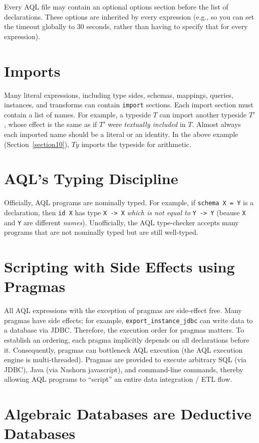 \documentclass[10pt]{book}
\begin{document}
Every AQL file may contain an optional options section before the list of declarations.  These options are inherited by every expression (e.g., so you can set the timeout globally to 30 seconds, rather than having to specify that for every expression).  

\section{Imports}

Many literal expressions, including type sides, schemas, mappings, queries, instances, and transforms can contain {\tt import} sections.  Each import section must contain a list of names.  For example, a typeside $T$ can import another typeside $T'$, whose effect is the same as if $T'$ were {\it textually included} in $T$.  Almost always each imported name should be a literal or an identity.  In the above example (Section~\ref{section10}), $Ty$ imports the typeside for arithmetic.
 
\section{AQL's Typing Discipline}

Officially, AQL programs are nominally typed.  For example, if {\tt schema X = Y} is a declaration, then {\tt id X} has type {\tt X -> X} {\it which is not equal to} {\tt Y -> Y} (beause {\tt X} and {\tt Y} are different {\it names}).  Unofficially, the AQL type-checker accepts many programs that are not nominally typed but are still well-typed.

\section{Scripting with Side Effects using Pragmas}

All AQL expressions with the exception of pragmas are side-effect free.  Many pragmas have side effects; for example, {\tt export\_instance\_jdbc} can write data to a database via JDBC.  Therefore, the execution order for pragmas matters.  To establish an ordering, each pragma implicitly depends on all declarations before it.  Consequently, pragmas can bottleneck AQL execution (the AQL execution engine is multi-threaded).  Pragmas are provided to execute arbitrary SQL (via JDBC), Java (via Nashorn javascript), and command-line commands, thereby allowing AQL programs to ``script'' an entire data integration / ETL flow.

\section{Algebraic Databases are Deductive Databases}
\end{document}
